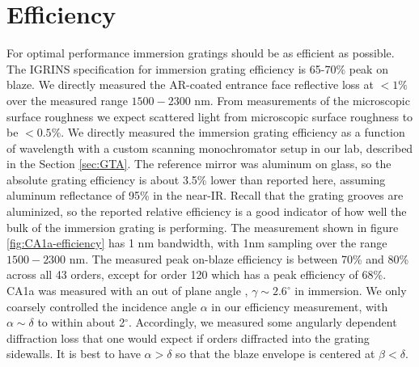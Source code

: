\section{Efficiency} 
For optimal performance immersion gratings should be as efficient as possible.  The IGRINS specification for immersion grating efficiency is 65-70\% peak on blaze\cite{2010SPIE.7739E.146W}. We directly measured the AR-coated entrance face reflective loss at $<1\%$ over the measured range $1500-2300$ nm.  From measurements of the microscopic surface roughness\cite{2010SPIE.7739E.146W} we expect scattered light from microscopic surface roughness to be $<0.5\%$.  We directly measured the immersion grating efficiency as a function of wavelength with a custom scanning monochromator setup in our lab, described in the Section \ref{sec:GTA}.  The reference mirror was aluminum on glass, so the absolute grating efficiency is about 3.5\% lower than reported here, assuming aluminum reflectance of 95\% in the near-IR.  Recall that the grating grooves are aluminized, so the reported relative efficiency is a good indicator of how well the bulk of the immersion grating is performing.  The measurement shown in figure \ref{fig:CA1a-efficiency} has 1 nm bandwidth, with 1nm sampling over the range $1500-2300$ nm.  The measured peak on-blaze efficiency is between 70\% and 80\% across all 43 orders, except for order 120 which has a peak efficiency of 68\%.  CA1a was measured with an out of plane angle \cite{schroeder1987}, $\gamma \sim 2.6^\circ$ in immersion.  We only coarsely controlled the incidence angle $\alpha$ in our efficiency measurement, with $\alpha \sim \delta$ to within about 2$^\circ$.  Accordingly, we measured some angularly dependent diffraction loss that one would expect if orders diffracted into the grating sidewalls.  It is best to have $\alpha > \delta$ so that the blaze envelope is centered at $\beta < \delta$.


